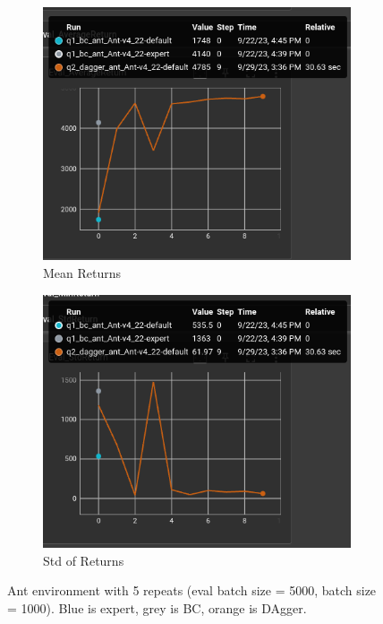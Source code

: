 \documentclass[11pt]{article}
\begin{document}
\begin{figure}[h]
    \centering
    \begin{subfigure}[b]{0.47\textwidth}
        \centering
        \includegraphics[width=\textwidth]{09-29-dag_ant_mean}
        \caption{Mean Returns}
        \label{fig:ant_mean}
    \end{subfigure}
    \hfill
    \begin{subfigure}[b]{0.47\textwidth}
        \centering
        \includegraphics[width=\textwidth]{09-29-dag_ant_std}
        \caption{Std of Returns}
        \label{fig:ant_std}
    \end{subfigure}
    \caption{Ant environment with 5 repeats (eval batch size = 5000, batch size = 1000). Blue is expert, grey is BC, orange is DAgger.}
    \label{fig:ant_dag}
\end{figure}
\end{document}
